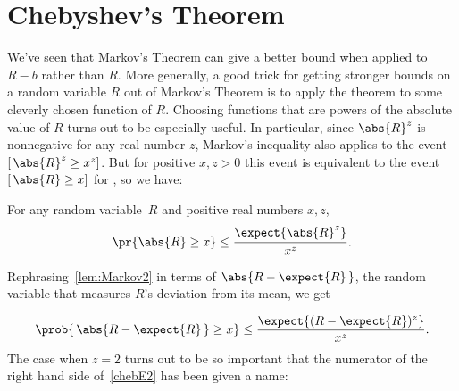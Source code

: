 \begin{problems}

\practiceproblems
{}

\classproblems
{}

\homeworkproblems
{}

\examproblems
{}

\end{problems}

\section{Chebyshev's Theorem}

We've seen that Markov's Theorem can give a better bound when applied
to $R-b$ rather than $R$.  More generally, a good trick for getting
stronger bounds on a random variable $R$ out of Markov's Theorem is to
apply the theorem to some cleverly chosen function of $R$.  Choosing
functions that are powers of the absolute value of $R$ turns out to be
especially useful.  In particular, since $\abs{R}^z$ is nonnegative
for any real number $z$, Markov's inequality also applies to the event
$[\, \abs{R}^z \geq x^z]$.  But for positive $x,z>0$ this event is equivalent
to the event $[\, \abs{R} \geq x]$ for , so we have:

\iffalse
It is a bit messy to apply Markov's Theorem directly to this problem,
because it's generally not easy to compute $\expect{\ \abs{R -
\expect{R}}\ }$.  However, since $\abs{R}$ and hence $\abs{R}^k$ are
nonnegative variables for any $R$, Markov's inequality also applies to the
event $[\abs{R}^k \geq x^k]$.  But this event is equivalent to the event
$[\abs{R} \geq x]$, so we have:
\fi

\begin{lemma}\label{lem:Markov2}
For any random variable~$R$ and positive real numbers $x,z$,
\[
\pr{\abs{R} \geq x} \leq \frac{\expect{\strut \abs{R}^z}}{x^z}.
\]
\end{lemma}
Rephrasing~\eqref{lem:Markov2} in terms of $\abs{R - \expect{R}\, }$,
the random variable that measures $R$'s deviation from its mean, we
get

\begin{equation}\label{chebE2}
  \prob{\,\abs{R - \expect{R}\,} \geq x} \leq \frac{\expect{(R - \expect{R})^z}}{x^z}.
\end{equation}
The case when $z =2$ turns out to be so important that the numerator
of the right hand side of~\eqref{chebE2} has been given a name:

